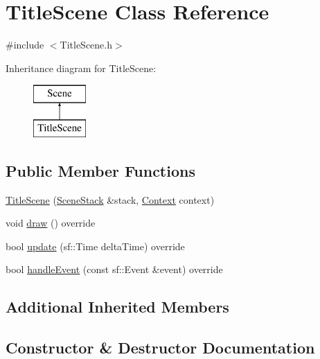 \hypertarget{class_title_scene}{}\section{Title\+Scene Class Reference}
\label{class_title_scene}


{\ttfamily \#include $<$Title\+Scene.\+h$>$}

Inheritance diagram for Title\+Scene\+:\begin{figure}[H]
\begin{center}
\leavevmode
\includegraphics[height=2.000000cm]{class_title_scene}
\end{center}
\end{figure}
\subsection*{Public Member Functions}
\begin{DoxyCompactItemize}
\item 
\hyperlink{class_title_scene_a280a3b1e5890f45b932860777f8fbe6d}{Title\+Scene} (\hyperlink{class_scene_stack}{Scene\+Stack} \&stack, \hyperlink{struct_scene_1_1_context}{Context} context)
\item 
void \hyperlink{class_title_scene_a3e527255771f75a41c4fe8aaa35999dd}{draw} () override
\item 
bool \hyperlink{class_title_scene_a17ce1b5b9f6f8ca44a6ed3326e9e5d0a}{update} (sf\+::\+Time delta\+Time) override
\item 
bool \hyperlink{class_title_scene_a1f019a83309ce967883b4b4d76b816af}{handle\+Event} (const sf\+::\+Event \&event) override
\end{DoxyCompactItemize}
\subsection*{Additional Inherited Members}


\subsection{Constructor \& Destructor Documentation}
\hypertarget{class_title_scene_a280a3b1e5890f45b932860777f8fbe6d}{}\label{class_title_scene_a280a3b1e5890f45b932860777f8fbe6d} 

